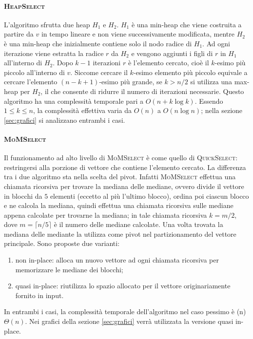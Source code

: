 \documentclass[a4paper,12pt]{article}
\newcommand{\QuickSelect}{\textsc{QuickSelect}}
\newcommand{\HeapSelect}{\textsc{HeapSelect}}
\newcommand{\MoMSelect}{\textsc{MoMSelect}}
\newcommand{\Tlin}{\ifmmode \Theta(n) \else $\Theta(n)$\fi} %
\begin{document}
\paragraph{\HeapSelect}
L'algoritmo sfrutta due heap $H_1$ e $H_2$.
$H_1$ è una min-heap che viene costruita a partire da $v$ in tempo lineare e non viene successivamente modificata, mentre $H_2$ è una min-heap che inizialmente contiene solo il nodo radice di $H_1$.
Ad ogni iterazione viene estratta la radice $r$ da $H_2$ e vengono aggiunti i figli di $r$ in $H_1$ all'interno di $H_2$.
Dopo $k-1$ iterazioni $r$ è l'elemento cercato, cioè il $k$-esimo più piccolo all'interno di $v$.
Siccome cercare il $k$-esimo elemento più piccolo equivale a cercare l'elemento $(n-k+1)$-esimo più grande, se $k>n/2$ si utilizza una max-heap per $H_2$, il che consente di ridurre il numero di iterazioni necessarie.
Questo algoritmo ha una complessità temporale pari a $O(n+k\log k)$.
Essendo $1 \le k \le n$, la complessità effettiva varia da $O(n)$ a $O(n\log n)$; nella sezione \ref{sec:grafici} si analizzano entrambi i casi.

\paragraph{\MoMSelect}
Il funzionamento ad alto livello di \MoMSelect{} è come quello di \QuickSelect: restringersi alla porzione di vettore che contiene l'elemento cercato.
La differenza tra i due algoritmo sta nella scelta del pivot.
Infatti \MoMSelect{} effettua una chiamata ricorsiva per trovare la mediana delle mediane, ovvero divide il vettore in blocchi da $5$ elementi (eccetto al più l'ultimo blocco), ordina poi ciascun blocco e ne calcola la mediana, quindi effettua una chiamata ricorsiva sulle mediane appena calcolate per trovarne la mediana; in tale chiamata ricorsiva $k=m/2$, dove $m=\lceil n/5\rceil$ è il numero delle mediane calcolate.
Una volta trovata la mediana delle mediante la utilizza come pivot nel partizionamento del vettore principale.
Sono proposte due varianti:
\begin{enumerate}
    \item non in-place: alloca un nuovo vettore ad ogni chiamata ricorsiva per memorizzare le mediane dei blocchi;
    \item quasi in-place: riutilizza lo spazio allocato per il vettore originariamente fornito in input.
\end{enumerate}
In entrambi i casi, la complessità temporale dell'algoritmo nel caso pessimo è \Tlin{}.
Nei grafici della sezione \ref{sec:grafici} verrà utilizzata la versione quasi in-place.
\end{document}
